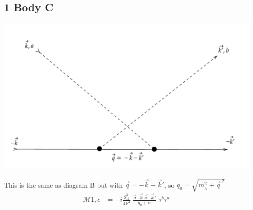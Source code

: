 \documentclass[11pt]{article}
\newcommand\mm{\mathcal{M}}
\newcommand{\mn}{m_{{}_N}}
\begin{document}
\subsection{1 Body C}
\begin{center}
    \includegraphics[scale=0.65]{1c.pdf}
\end{center}
This is the same as diagram B but with $\vec{q}=-\vec{k}-\vec{k}'$, so $q_0=\sqrt{\mn^2 + \vec{q}^{\:2}}$
\begin{align}
    \mm{1,c} &= -i\frac{g_A^2}{4F^2}\; \frac{ \vec{\sigma}\cdot \vec{k}\; \vec{\sigma}\cdot \vec{k}\,' }{q_0 +i \varepsilon}\; \tau^b \tau^a
\end{align}
\newpage
\end{document}
